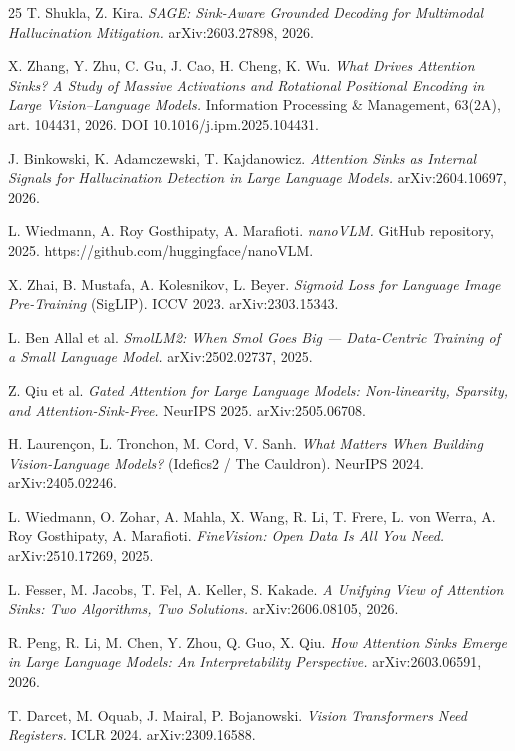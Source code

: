 \documentclass{article}
\begin{document}
\begin{thebibliography}{25}
T. Shukla, Z. Kira. \textit{SAGE: Sink-Aware Grounded Decoding for Multimodal Hallucination Mitigation.} arXiv:2603.27898, 2026.

X. Zhang, Y. Zhu, C. Gu, J. Cao, H. Cheng, K. Wu. \textit{What Drives Attention Sinks? A Study of Massive Activations and Rotational Positional Encoding in Large Vision--Language Models.} Information Processing \& Management, 63(2A), art. 104431, 2026. DOI 10.1016/j.ipm.2025.104431.

J. Binkowski, K. Adamczewski, T. Kajdanowicz. \textit{Attention Sinks as Internal Signals for Hallucination Detection in Large Language Models.} arXiv:2604.10697, 2026.

L. Wiedmann, A. Roy Gosthipaty, A. Marafioti. \textit{nanoVLM.} GitHub repository, 2025. https://github.com/huggingface/nanoVLM.

X. Zhai, B. Mustafa, A. Kolesnikov, L. Beyer. \textit{Sigmoid Loss for Language Image Pre-Training} (SigLIP). ICCV 2023. arXiv:2303.15343.

L. Ben Allal et al. \textit{SmolLM2: When Smol Goes Big --- Data-Centric Training of a Small Language Model.} arXiv:2502.02737, 2025.

Z. Qiu et al. \textit{Gated Attention for Large Language Models: Non-linearity, Sparsity, and Attention-Sink-Free.} NeurIPS 2025. arXiv:2505.06708.

H. Lauren\c{c}on, L. Tronchon, M. Cord, V. Sanh. \textit{What Matters When Building Vision-Language Models?} (Idefics2 / The Cauldron). NeurIPS 2024. arXiv:2405.02246.

L. Wiedmann, O. Zohar, A. Mahla, X. Wang, R. Li, T. Frere, L. von Werra, A. Roy Gosthipaty, A. Marafioti. \textit{FineVision: Open Data Is All You Need.} arXiv:2510.17269, 2025.

L. Fesser, M. Jacobs, T. Fel, A. Keller, S. Kakade. \textit{A Unifying View of Attention Sinks: Two Algorithms, Two Solutions.} arXiv:2606.08105, 2026.

R. Peng, R. Li, M. Chen, Y. Zhou, Q. Guo, X. Qiu. \textit{How Attention Sinks Emerge in Large Language Models: An Interpretability Perspective.} arXiv:2603.06591, 2026.

T. Darcet, M. Oquab, J. Mairal, P. Bojanowski. \textit{Vision Transformers Need Registers.} ICLR 2024. arXiv:2309.16588.

\end{thebibliography}
\normalsize
\end{document}
